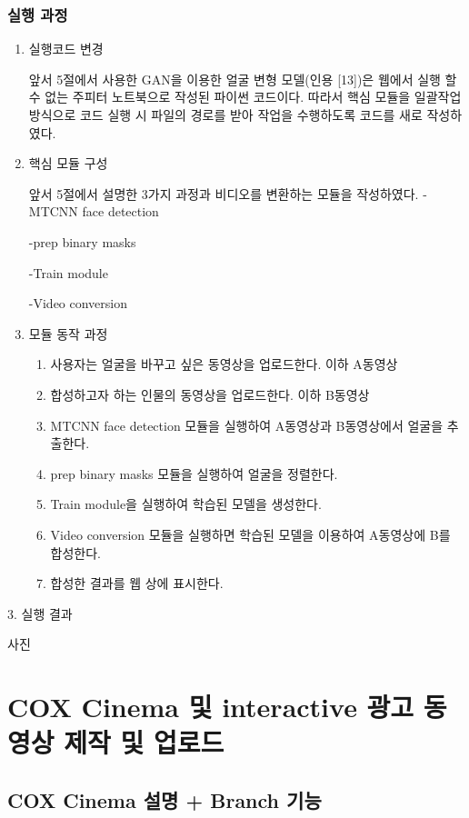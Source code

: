\documentclass{oblivoir}
\begin{document}
\subsection{실행 과정}
\begin{enumerate}%

    \item 실행코드 변경

    앞서 5절에서 사용한 GAN을 이용한 얼굴 변형 모델(인용 [13])은 웹에서 실행 할 수 없는 주피터 노트북으로 작성된 파이썬 코드이다. 따라서 핵심 모듈을 일괄작업 방식으로 코드 실행 시 파일의 경로를 받아 작업을 수행하도록 코드를 새로 작성하였다.

    \item 핵심 모듈 구성

    앞서 5절에서 설명한 3가지 과정과 비디오를 변환하는 모듈을 작성하였다.
    -MTCNN face detection


    -prep binary masks

    -Train module

    -Video conversion

    \item 모듈 동작 과정
    \begin{enumerate}
        \item  사용자는 얼굴을 바꾸고 싶은 동영상을 업로드한다. 이하 A동영상
        \item 합성하고자 하는 인물의 동영상을 업로드한다. 이하 B동영상
        \item MTCNN face detection 모듈을 실행하여 A동영상과 B동영상에서 얼굴을 추출한다.
        \item prep binary masks 모듈을 실행하여 얼굴을 정렬한다.
        \item Train module을 실행하여 학습된 모델을 생성한다.
        \item Video conversion 모듈을 실행하면 학습된 모델을 이용하여 A동영상에 B를 합성한다.
        \item 합성한 결과를 웹 상에 표시한다.
    \end{enumerate}

\end{enumerate}
3. 실행 결과

사진

\chapter{ COX Cinema 및 interactive 광고 동영상 제작 및 업로드}

\section{ COX Cinema 설명 + Branch 기능}
\end{document}
